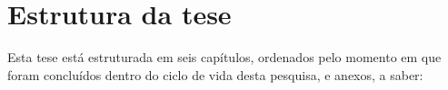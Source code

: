 



















\section{Estrutura da tese}

Esta tese está estruturada em seis capítulos, ordenados pelo momento em que foram concluídos dentro do ciclo de vida desta pesquisa, e anexos, a saber:

